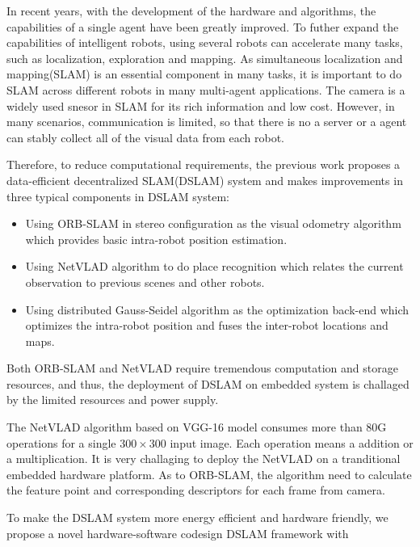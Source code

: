 \label{sec:introdutction}
In recent years, with the development of the hardware and algorithms, the capabilities of a single agent have been greatly improved.
To futher expand the capabilities of intelligent robots, using several robots can accelerate many tasks, such as localization, exploration and mapping.
As simultaneous localization and mapping(SLAM) is an essential component in many tasks, it is important to do SLAM across different robots in many multi-agent applications. 
The camera is a widely used snesor in SLAM for its rich information and low cost. 
However, in many scenarios, communication is limited, so that there is no a server or a agent can stably collect all of the visual data from each robot.

Therefore, to reduce computational requirements, the previous work \cite{Cieslewski:20187ee} proposes a data-efficient decentralized SLAM(DSLAM) system and makes improvements in three typical components in DSLAM system:
\begin{itemize}
\item Using ORB-SLAM \cite{orbslam} in stereo configuration as the visual odometry algorithm which provides basic intra-robot position estimation.
\item Using NetVLAD \cite{Arandjelovic:2017997} algorithm to do place recognition which relates the current observation to previous scenes and other robots.
\item Using distributed Gauss-Seidel algorithm \cite{parallel_distributed} as the optimization back-end which optimizes the intra-robot position and fuses the inter-robot locations and maps.
\end{itemize}

Both ORB-SLAM and NetVLAD require tremendous computation and storage resources, and thus, the deployment of DSLAM on embedded system is challaged by the limited resources and power supply.

The NetVLAD algorithm based on VGG-16 model \cite{vgg16} consumes more than 80G operations for a single $300 \times 300$ input image. Each operation means a addition or a multiplication. It is very challaging to deploy the NetVLAD on a tranditional embedded hardware platform. 
As to ORB-SLAM, the algorithm need to calculate the feature point and corresponding descriptors for each frame from camera.

To make the DSLAM system more energy efficient and hardware friendly, we propose a novel hardware-software codesign DSLAM framework with 